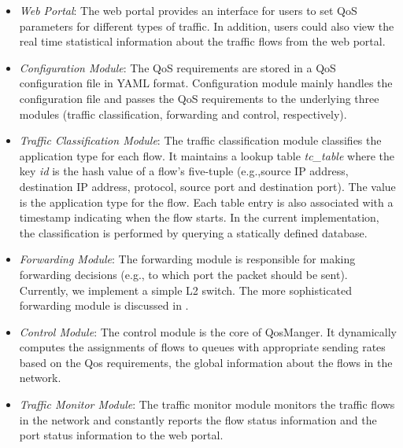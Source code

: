 \begin{itemize}
  \item \emph{Web Portal}: The web portal provides an interface for users to set QoS parameters for
    different types of traffic. In addition, users could also view the real time statistical information
    about the traffic flows from the web portal.
  \item \emph{Configuration Module}: The QoS requirements are stored in a QoS configuration file in YAML
    format. Configuration module mainly handles the configuration file and passes the QoS requirements
    to the underlying three modules (traffic classification, forwarding and control, respectively).
  \item \emph{Traffic Classification Module}: The traffic classification module classifies the application
    type for each flow. It maintains a lookup table \emph{tc\_table} where the key \emph{id} is the hash value of a
    flow's five-tuple (e.g.,source IP address, destination IP address, protocol, source port and destination port).
    The value is the application type for the flow. Each table entry is also associated with a timestamp indicating
    when the flow starts. In the current implementation, the classification is performed by querying a statically
    defined database.
  \item \emph{Forwarding Module}: The forwarding module is responsible for making forwarding decisions (e.g.,
    to which port the packet should be sent). Currently, we implement a simple L2 switch. The more sophisticated
    forwarding module is discussed in .
  \item \emph{Control Module}: The control module is the core of QosManger. It dynamically computes the
    assignments of flows to queues with appropriate sending rates based on the Qos requirements, the global
    information about the flows in the network.
  \item \emph{Traffic Monitor Module}: The traffic monitor module monitors the traffic flows in the network
    and constantly reports the flow status information and the port status information to the web portal.
\end{itemize}

